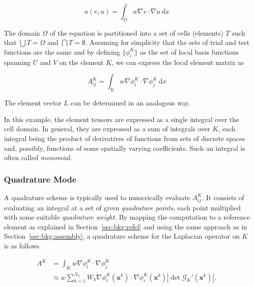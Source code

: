 \begin{equation}
\label{sec:bkg:eq:spec-laplacian}
a(v, u) = \int_\Omega w \nabla v \cdot \nabla u\ \mathrm{d}x
\end{equation}

The domain $\Omega$ of the equation is partitioned into a set of cells (elements) $T$ such that $\bigcup T = \Omega$ and $\bigcap T = \emptyset$. Assuming for simplicity that the sets of trial and test functions are the same and by defining $\lbrace \phi_i^K \rbrace$ as the set of local basis functions spanning $U$ and $V$ on the element $K$, we can express the local element matrix as

\begin{equation}
\label{sec:bkg:stiffness}
A_{ij}^K = \int_K w \nabla \phi_i^K \cdot \nabla \phi_j^K\ \mathrm{d}x
\end{equation}

The element vector $L$ can be determined in an analogous way. 


In this example, the element tensors are expressed as a single integral over the cell domain. In general, they are expressed as a sum of integrals over $K$, each integral being the product of derivatives of functions from sets of discrete spaces and, possibly, functions of some spatially varying coefficients. Such an integral is often called \textit{monomial}. 

\subsubsection{Quadrature Mode}
A quadrature scheme is typically used to numerically evaluate $A_{ij}^K$. It consists of evaluating an integral at a set of given {\em quadrature points}, each point multiplied with some suitable {\em quadrature weight}. By mapping the computation to a reference element as explained in Section~\ref{sec:bkg:refel} and using the same approach as in Section~\ref{sec:bkg:assembly}, a quadrature scheme for the Laplacian operator on $K$ is as follows

\begin{equation}
\begin{split}
A^K & = \int_K w \nabla \phi_i^K \cdot \nabla \phi_j^K \\
& \approx w \sum_{k=1}^{N_q} W_k \nabla \phi_i^K(\boldsymbol{x}^k) \cdot \nabla \phi_i^K (\boldsymbol{x}^k) | \operatorname{det} \mathcal{G}_K'(\boldsymbol{x}^k) |,
\end{split}
\end{equation} 

